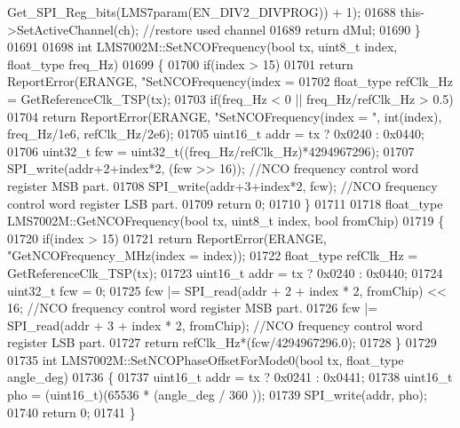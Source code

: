 \begin{DoxyCode}
{{{{{{{{{{{{{{{{{{{{{{{{{{{{{{{{{{{{{{{{{{{{{{{{{      Get_SPI_Reg_bits(LMS7param(EN_DIV2_DIVPROG)) + 1);
01688     this->SetActiveChannel(ch); \textcolor{comment}{//restore used channel}
01689     \textcolor{keywordflow}{return} dMul;
01690 \}
01691 
01698 \textcolor{keywordtype}{int} LMS7002M::SetNCOFrequency(\textcolor{keywordtype}{bool} tx, uint8\_t index, float_type freq\_Hz)
01699 \{
01700     \textcolor{keywordflow}{if}(index > 15)
01701         \textcolor{keywordflow}{return} ReportError(ERANGE, \textcolor{stringliteral}{"SetNCOFrequency(index = %
01702     float_type refClk\_Hz = GetReferenceClk_TSP(tx);
01703     \textcolor{keywordflow}{if}(freq\_Hz < 0 || freq\_Hz/refClk\_Hz > 0.5)
01704         \textcolor{keywordflow}{return} ReportError(ERANGE, \textcolor{stringliteral}{"SetNCOFrequency(index = %
      "}, \textcolor{keywordtype}{int}(index), freq\_Hz/1e6, refClk\_Hz/2e6);
01705     uint16\_t addr = tx ? 0x0240 : 0x0440;
01706     uint32\_t fcw = uint32\_t((freq\_Hz/refClk\_Hz)*4294967296);
01707     SPI_write(addr+2+index*2, (fcw >> 16)); \textcolor{comment}{//NCO frequency control word register MSB part.}
01708     SPI_write(addr+3+index*2, fcw); \textcolor{comment}{//NCO frequency control word register LSB part.}
01709     \textcolor{keywordflow}{return} 0;
01710 \}
01711 
01718 float_type LMS7002M::GetNCOFrequency(\textcolor{keywordtype}{bool} tx, uint8\_t index, \textcolor{keywordtype}{bool} fromChip)
01719 \{
01720     \textcolor{keywordflow}{if}(index > 15)
01721         \textcolor{keywordflow}{return} ReportError(ERANGE, \textcolor{stringliteral}{"GetNCOFrequency\_MHz(index = %
      index));
01722     float_type refClk\_Hz = GetReferenceClk_TSP(tx);
01723     uint16\_t addr = tx ? 0x0240 : 0x0440;
01724     uint32\_t fcw = 0;
01725     fcw |= SPI_read(addr + 2 + index * 2, fromChip) << 16; \textcolor{comment}{//NCO frequency control word register MSB part.}
01726     fcw |= SPI_read(addr + 3 + index * 2, fromChip); \textcolor{comment}{//NCO frequency control word register LSB part.}
01727     \textcolor{keywordflow}{return} refClk\_Hz*(fcw/4294967296.0);
01728 \}
01729 
01735 \textcolor{keywordtype}{int} LMS7002M::SetNCOPhaseOffsetForMode0(\textcolor{keywordtype}{bool} tx, float_type angle\_deg)
01736 \{
01737     uint16\_t addr = tx ? 0x0241 : 0x0441;
01738     uint16\_t pho = (uint16\_t)(65536 * (angle\_deg / 360 ));
01739     SPI_write(addr, pho);
01740     \textcolor{keywordflow}{return} 0;
01741 \}
}}}}}}}}}}}}}}}}}}}}}}}}}}}}}}}}}}}}}}}}}}}}}}}}}}}
\end{DoxyCode}
